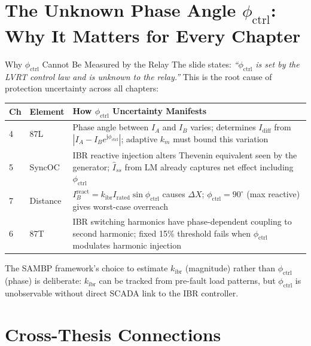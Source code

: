 \documentclass[12pt,a4paper]{article}
\newcommand{\kibr}{k_\mathrm{ibr}}
\newcommand{\Irated}{I_\mathrm{rated}}
\newcommand{\Idiff}{I_\mathrm{diff}}
\newcommand{\km}{k_m}
\newcommand{\phictrl}{\phi_\mathrm{ctrl}}
\newcommand{\jj}{\mathrm{j}}
\begin{document}
\section{The Unknown Phase Angle $\phictrl$: Why It Matters for Every Chapter}

\begin{archbox}{Why $\phictrl$ Cannot Be Measured by the Relay}
The slide states: \emph{``$\phictrl$ is set by the LVRT control law and is unknown to
the relay.''} This is the root cause of protection uncertainty across all chapters:

\begin{center}
\small
\begin{tabular}{@{}llp{7cm}@{}}
\toprule
\textbf{Ch} & \textbf{Element} & \textbf{How $\phictrl$ Uncertainty Manifests} \\
\midrule
4 & 87L  & Phase angle between $I_A$ and $I_B$ varies; determines $\Idiff$ from
            $|I_A - I_B e^{\jj\phictrl}|$; adaptive $\km$ must bound this variation \\
5 & SyncOC & IBR reactive injection alters Thevenin equivalent seen by the generator;
              $\hat{I}_{ss}$ from LM already captures net effect including $\phictrl$ \\
7 & Distance & $I_B^\mathrm{react} = \kibr\Irated\sin\phictrl$ causes $\Delta X$;
               $\phictrl = 90^\circ$ (max reactive) gives worst-case overreach \\
6 & 87T  & IBR switching harmonics have phase-dependent coupling to second harmonic;
           fixed 15\% threshold fails when $\phictrl$ modulates harmonic injection \\
\bottomrule
\end{tabular}
\end{center}

The SAMBP framework's choice to estimate $\kibr$ (magnitude) rather than $\phictrl$
(phase) is deliberate: $\kibr$ can be tracked from pre-fault load patterns, but
$\phictrl$ is unobservable without direct SCADA link to the IBR controller.
\end{archbox}

\section{Cross-Thesis Connections}
\end{document}
